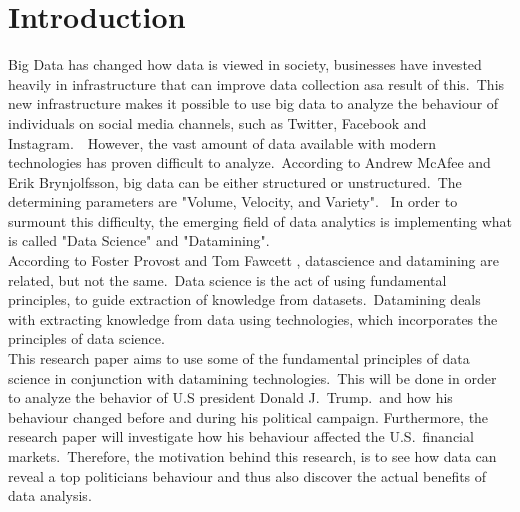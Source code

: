\documentclass[12pt]{article}
\begin{document}
\cleardoublepage %



















\color{NavyBlue} \section{Introduction} \label{sec:intro}

\color {black}

Big Data has changed how data is viewed in society, businesses have invested heavily in infrastructure that can improve data collection asa result of this.\ This new infrastructure makes it possible to use big data to analyze the behaviour of individuals on social media channels, such as Twitter, Facebook and Instagram.\ \citep{foster}\ However, the vast amount of data available with modern technologies has proven difficult to analyze.\ According to Andrew McAfee and Erik Brynjolfsson, big data can be either structured or unstructured.\ The determining parameters are "Volume, Velocity, and Variety". \citep{velocity}\ In order to surmount  this difficulty,  the emerging field of data analytics is implementing what is called "Data Science" and "Datamining".\ \\

According to Foster Provost and Tom Fawcett , datascience and datamining are related, but not the same.\  Data science is the act of using fundamental principles, to guide extraction of knowledge from datasets.\ Datamining deals with extracting knowledge from data using technologies, which incorporates the principles of data science.\ \citep{foster} \\

This research paper aims to use some of the fundamental principles of data science in conjunction with datamining technologies.\ This will be done in order to analyze the behavior of U.S president Donald J.\ Trump.\ and how his behaviour changed before and during his political campaign. Furthermore, the research paper will investigate how  his behaviour affected the U.S.\ financial markets.\ Therefore, the motivation behind this research, is to see how data can reveal a top politicians behaviour and thus also discover the actual benefits of data analysis. 
\end{document}
